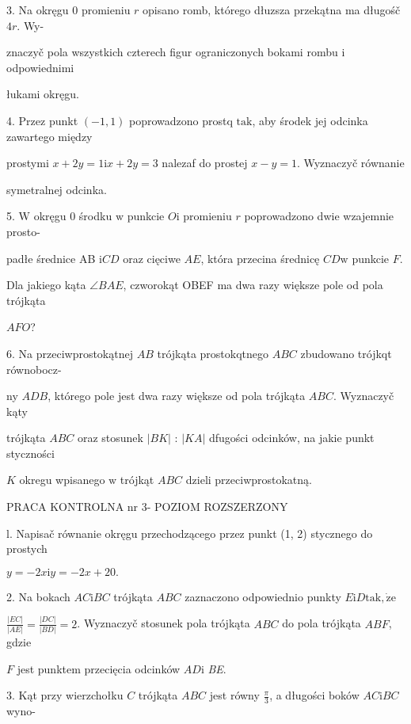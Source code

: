 \documentclass[a4paper,12pt]{article}
\begin{document}
3. Na okręgu $0$ promieniu $r$ opisano romb, którego dłuzsza przekątna ma długośč $4r$. Wy-

znaczyč pola wszystkich czterech figur ograniczonych bokami rombu $\mathrm{i}$ odpowiednimi

łukami okręgu.

4. Przez punkt $(-1,1)$ poprowadzono prostq $\mathrm{t}\mathrm{a}\mathrm{k}$, aby środek jej odcinka zawartego między

prostymi $x+2y= 1\mathrm{i}x+2y=3$ nalezaf do prostej $x-y= 1$. Wyznaczyč równanie

symetralnej odcinka.

5. $\mathrm{W}$ okręgu $0$ środku $\mathrm{w}$ punkcie $O\mathrm{i}$ promieniu $r$ poprowadzono dwie wzajemnie prosto-

padłe średnice AB $\mathrm{i}CD$ oraz cięciwe $AE$, która przecina średnicę $CD\mathrm{w}$ punkcie $F.$

Dla jakiego kąta $\angle BAE$, czworokąt OBEF ma dwa razy większe pole od pola trójkąta

$AFO$?

6. Na przeciwprostokątnej $AB$ trójkąta prostokqtnego $ABC$ zbudowano trójkqt równobocz-

ny $ADB$, którego pole jest dwa razy większe od pola trójkąta $ABC$. Wyznaczyč kąty

trójkąta $ABC$ oraz stosunek $|BK|$ : $|KA|$ dfugości odcinków, na jakie punkt styczności

$K$ okregu wpisanego $\mathrm{w}$ trójkąt $ABC$ dzieli przeciwprostokatną.





PRACA KONTROLNA nr 3- POZIOM ROZSZERZONY

l. Napisač równanie okręgu przechodzącego przez punkt (1, 2) stycznego do prostych

$y=-2x\mathrm{i}y=-2x+20.$

2. Na bokach $AC \mathrm{i} BC$ trójkąta $ABC$ zaznaczono odpowiednio punkty $E \mathrm{i} D \mathrm{t}\mathrm{a}\mathrm{k}, \dot{\mathrm{z}}\mathrm{e}$

$\displaystyle \frac{|EC|}{|AE|}=\frac{|DC|}{|BD|}=2$. Wyznaczyč stosunek pola trójkąta $ABC$ do pola trójkąta $ABF$, gdzie

$F$ jest punktem przecięcia odcinków $AD\mathrm{i}$ {\it BE}.

3. Kąt przy wierzchołku $C$ trójkąta $ABC$ jest równy $\displaystyle \frac{\pi}{3}$, a długości boków $AC\mathrm{i}BC$ wyno-
\end{document}
